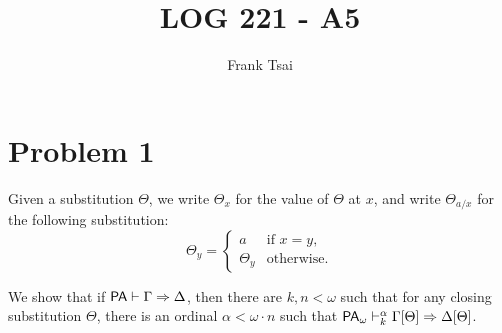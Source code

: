 \documentclass[a4paper]{article}
\title{LOG 221 - A5}
\author{Frank Tsai}
\begin{document}
\maketitle


\section*{Problem 1}\label{0001}

\begin{notation}
  Given a substitution $\Theta$, we write $\Theta_{x}$ for the value of $\Theta$ at $x$, and write $\Theta_{a/x}$ for the following substitution:
  \[
    \Theta_y =
    \begin{cases}
      a & \text{if $x = y$},\\
      \Theta_y & \text{otherwise.}
    \end{cases}
  \]
\end{notation}

We show that if $\mathsf{PA}\vdash \Gamma \Rightarrow \Delta$, then there are $k, n < \omega$ such that for any closing substitution $\Theta$, there is an ordinal $\alpha < \omega \cdot n$ such that $\mathsf{PA}_{\omega}\vdash^{\alpha}_{k} \Gamma[\Theta] \Rightarrow \Delta[\Theta]$.
\end{document}
